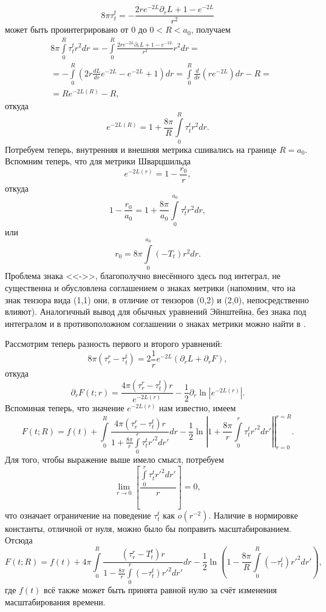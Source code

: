 \documentclass[a4paper, 14pt]{scrarticle}
\theoremstyle{Imperial}
\begin{document}
	$$8\pi \tau^t_t = - \frac{2 r e^{-2L} \partial_r L + 1 - e^{-2L}}{r^2}$$
	может быть проинтегрировано от $0$ до $0 < R < a_0$, получаем
	$$\begin{aligned}
		&8\pi\int\limits_0^{R} \tau^t_t r^2 dr = - \int\limits_0^{R} \frac{2 r e^{-2L} \partial_r L + 1 - e^{-2L}}{r^2} r^2 dr = \\
		&= - \int\limits_0^{R} \left(2 r \frac{dL}{dr} e^{-2L} - e^{-2L} + 1\right) dr =  \int\limits_0^{R} \frac{d}{dr} \left( r e^{-2L} \right) dr - R =\\
		&= R e^{-2L(R)} - R,
	\end{aligned}$$	
	откуда
	$$e^{-2L(R)} = 1 + \frac{8\pi}{R} \int\limits_0^{R} \tau^t_t r^2 dr.$$
	Потребуем теперь, внутренняя и внешняя метрика сшивались на границе $R = a_0$. Вспомним теперь, что для метрики Шварцшильда
	$$e^{-2L(r)} = 1 - \frac{r_0}{r},$$
	откуда 
	$$ 1 - \frac{r_0}{a_0} = 1 + \frac{8\pi}{a_0} \int\limits_0^{a_0} \tau^t_t r^2 dr,$$
	или 	
	\begin{equation}
		r_0 = 8\pi \int\limits_0^{a_0} \left( -T_t \right) r^2 dr.
	\end{equation}
	Проблема знака <<->>, благополучно внесённого здесь под интеграл, не существенна и обусловлена соглашением о знаках метрики (напомним, что на знак тензора вида (1,1) они, в отличие от тензоров (0,2) и (2,0), непосредственно влияют). Аналогичный вывод для обычных уравнений Эйнштейна, без знака под интегралом и в противоположном соглашении о знаках метрики можно найти в \cite{ЛЛII}.
	
	Рассмотрим теперь разность первого и второго уравнений:
	$$8\pi \left( \tau^r_r - \tau^t_t \right) = 2 \frac{1}{r} e^{-2L} \left( \partial_r L + \partial_r F \right),$$
	откуда
	$$\partial_r F(t;r) = \frac{4\pi \left( \tau^r_r - \tau^t_t \right) r}{e^{-2L(r)}} - \frac{1}{2} \partial_r \ln |e^{-2L(r)}|.$$
	Вспоминая теперь, что значение $e^{-2L(r)}$ нам известно, имеем
	$$F(t;R) = f(t) + \int\limits_0^R \frac{4\pi \left( \tau^r_r - \tau^t_t \right) r}{1 + \frac{8\pi}{r} \int\limits_0^{r} \tau^t_t r'^2 dr'} dr - \left. \frac{1}{2} \ln \left| 1 + \frac{8\pi}{r} \int\limits_0^{r} \tau^t_t r'^2 dr' \right| \right|_{r=0}^{r=R}.$$	
	Для того, чтобы выражение выше имело смысл, потребуем 
	$$\underset{r \rightarrow 0} \lim \left[ \frac{ \int\limits_0^{r} \tau^t_t r'^2 dr'}{r} \right]  = 0,$$
	что означает ограничение на поведение $\tau^t_t$ как $o(r^{-2})$. Наличие в  нормировке константы, отличной от нуля, можно было бы поправить масштабированием. Отсюда
	$$F(t;R) = f(t) + 4\pi \int\limits_0^R \frac{\left( \tau^r_r - T^t_t \right) r}{1 - \frac{8\pi}{r} \int\limits_0^{r} (-\tau^t_t) r'^2 dr'} dr - \frac{1}{2} \ln \left( 1 - \frac{8\pi}{R} \int\limits_0^{R} (-\tau^t_t) r'^2 dr' \right),$$	
	где $f(t)$ всё также может быть принята равной нулю за счёт изменения масштабирования времени.
	
\end{document}
